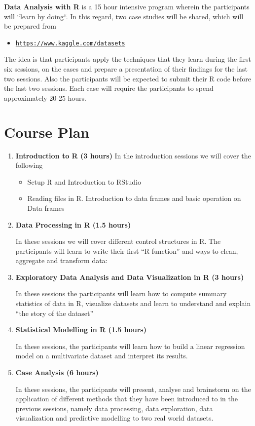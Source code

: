 \textbf{Data Analysis with R} is a 15 hour intensive program wherein the participants will ``learn by doing``. In this regard, two case studies will be shared, which will be prepared from 
  \begin{itemize}
    \item  \texttt{\url{https://www.kaggle.com/datasets}}
  \end{itemize}
\noindent The idea is that participants apply the techniques that they learn during the first six sessions, on the cases and prepare a presentation of their findings for the last two sessions. Also the participants will be expected to submit their R code before the last two sessions. Each case will require the participants to spend approximately 20-25 hours.

\section*{Course Plan}
\begin{enumerate} 
    \item \textbf{Introduction to R (3 hours)}
     In the introduction sessions we will cover the following
    \begin{itemize}
      \item Setup R and Introduction to RStudio 
      \item Reading files in R. Introduction to data frames and basic operation on Data frames 
    \end{itemize}
    
    \item \textbf{Data Processing in R (1.5 hours)}
    
In these sessions we will cover different control structures in R. The participants will learn to write their first ``R function'' and ways to clean, aggregate and transform data:
    \item \textbf{Exploratory Data Analysis and Data Visualization in R (3 hours)}
    
In these sessions the participants will learn how to compute summary statistics of data in R, visualize datasets and learn to understand and explain ``the story of the dataset''
    \item \textbf{Statistical Modelling in R (1.5 hours)}
    
In these sessions, the participants will learn how to build a linear regression model on a multivariate dataset and interpret its results.
    \item \textbf{Case Analysis (6 hours)}
    
In these sessions, the participants will present, analyse and brainstorm on the application of different methods that they have been introduced to in the previous sessions, namely data processing, data exploration, data visualization and predictive modelling to two real world datasets.
  \end{enumerate}

